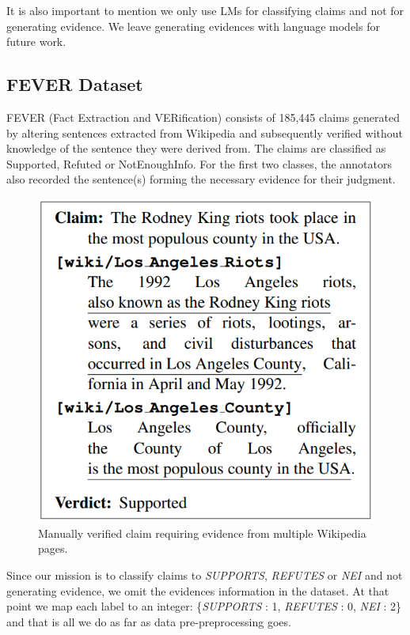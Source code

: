 \documentclass[conference]{IEEEtran}
\begin{document}
It is also important to mention we only use LMs for classifying claims and not for generating evidence. We leave generating evidences with language models for future work.

\subsection{FEVER Dataset}
FEVER (Fact Extraction and VERification) consists of 185,445 claims generated by altering sentences extracted from Wikipedia and subsequently verified without knowledge of the sentence they were derived from. The claims are classified as Supported, Refuted or NotEnoughInfo. For the first two classes, the annotators also recorded the sentence(s) forming the necessary evidence for their judgment\cite{thorne2018fever}.

\begin{figure}[htp]
    \centering
    \includegraphics[scale=0.3]{fever_example.png}
    \caption{Manually verified claim requiring evidence from multiple Wikipedia pages.}
    \label{fig:fever_example}
\end{figure}

Since our mission is to classify claims to \textit{SUPPORTS}, \textit{REFUTES} or \textit{NEI} and not generating evidence, we omit the evidences information in the dataset. At that point we map each label to an integer: \{\textit{SUPPORTS} : 1, \textit{REFUTES} : 0, \textit{NEI} : 2\} and that is all we do as far as data pre-preprocessing goes.
\end{document}
